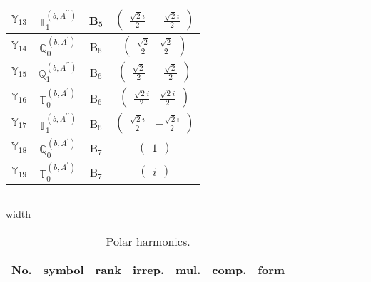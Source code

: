 \documentclass[fleqn,10pt,landscape]{article}
\begin{document}
\begin{itemize}
\begin{center}
\begin{longtable}{c|c|c|c}
$ \mathbb{Y}_{13} $ & $\mathbb{T}_{1}^{(b,A^{\prime\prime})}$ & B$_{5}$ & $\begin{pmatrix} \frac{\sqrt{2} i}{2} & - \frac{\sqrt{2} i}{2} \end{pmatrix}$ \\ \hline
$ \mathbb{Y}_{14} $ & $\mathbb{Q}_{0}^{(b,A^{\prime})}$ & B$_{6}$ & $\begin{pmatrix} \frac{\sqrt{2}}{2} & \frac{\sqrt{2}}{2} \end{pmatrix}$ \\
$ \mathbb{Y}_{15} $ & $\mathbb{Q}_{1}^{(b,A^{\prime\prime})}$ & B$_{6}$ & $\begin{pmatrix} \frac{\sqrt{2}}{2} & - \frac{\sqrt{2}}{2} \end{pmatrix}$ \\
$ \mathbb{Y}_{16} $ & $\mathbb{T}_{0}^{(b,A^{\prime})}$ & B$_{6}$ & $\begin{pmatrix} \frac{\sqrt{2} i}{2} & \frac{\sqrt{2} i}{2} \end{pmatrix}$ \\
$ \mathbb{Y}_{17} $ & $\mathbb{T}_{1}^{(b,A^{\prime\prime})}$ & B$_{6}$ & $\begin{pmatrix} \frac{\sqrt{2} i}{2} & - \frac{\sqrt{2} i}{2} \end{pmatrix}$ \\ \hline
$ \mathbb{Y}_{18} $ & $\mathbb{Q}_{0}^{(b,A^{\prime})}$ & B$_{7}$ & $\begin{pmatrix} 1 \end{pmatrix}$ \\
$ \mathbb{Y}_{19} $ & $\mathbb{T}_{0}^{(b,A^{\prime})}$ & B$_{7}$ & $\begin{pmatrix} i \end{pmatrix}$ \\
\end{longtable}
\end{center}

 \hfil \hrule height 1mm width \textwidth \hfil

\begin{center}
\renewcommand{\arraystretch}{1.3}
\begin{longtable}{ccccccc}
\caption{Polar harmonics.}
 \\
 \hline \hline
No. & symbol & rank & irrep. & mul. & comp. & form \\ \hline \endfirsthead


\end{longtable}
\end{center}
\end{itemize}
\end{document}
